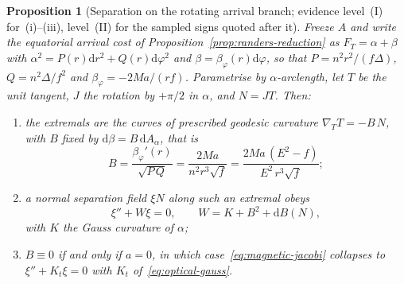 \documentclass[12pt]{iopart}
\theoremstyle{plain}
\newtheorem{proposition}{Proposition}
\theoremstyle{definition}
\theoremstyle{remark}
\newcommand{\dd}{\mathrm{d}}
\begin{document}
\begin{proposition}[Separation on the rotating arrival branch; evidence
level~(I) for~(i)--(iii), level~(II) for the sampled signs quoted after it]
\label{prop:rot-separation}
Freeze $A$ and write the equatorial arrival cost
of Proposition~\ref{prop:randers-reduction} as $F_T=\alpha+\beta$ with
$\alpha^2=P(r)\dd r^2+Q(r)\dd\varphi^2$ and $\beta=\beta_\varphi(r)\dd\varphi$,
so that $P=n^2r^2/(f\Delta)$, $Q=n^2\Delta/f^2$ and
$\beta_\varphi=-2Ma/(rf)$. Parametrise by $\alpha$-arclength, let $T$ be the unit
tangent, $J$ the rotation by $+\pi/2$ in $\alpha$, and $N=JT$. Then:
\begin{enumerate}
\item[(i)] the extremals are the curves of prescribed geodesic curvature
$\nabla_TT=-B\,N$, with $B$ fixed by $\dd\beta=B\,\dd A_\alpha$, that is
\begin{equation}
    B=\frac{\beta_\varphi'(r)}{\sqrt{P\,Q}}
     =\frac{2Ma}{n^2r^3\sqrt f}
     =\frac{2Ma\,(E^2-f)}{E^2\,r^3\sqrt f} ;
    \label{eq:magnetic-B}
\end{equation}
\item[(ii)] a normal separation field $\xi N$ along such an extremal obeys
\begin{equation}
    \xi''+W\xi=0 ,\qquad W=K+B^2+\dd B(N) ,
    \label{eq:magnetic-jacobi}
\end{equation}
with $K$ the Gauss curvature of $\alpha$;
\item[(iii)] $B\equiv0$ if and only if $a=0$, in which case~\eqref{eq:magnetic-jacobi}
collapses to $\xi''+K_t\xi=0$ with $K_t$ of~\eqref{eq:optical-gauss}.
\end{enumerate}
\end{proposition}
\end{document}
